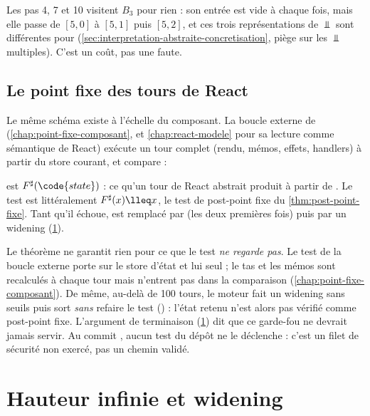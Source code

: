 Les pas 4, 7 et 10 visitent $B_3$ pour rien : son entrée est vide à chaque
fois, mais elle passe de $[5,0]$ à $[5,1]$ puis $[5,2]$, et ces trois
représentations de $\Bot$ sont différentes pour 
(\cref{sec:interpretation-abstraite-concretisation}, piège sur les $\Bot$
multiples). C'est un coût, pas une faute.

\subsection{Le point fixe des tours de React}

Le même schéma existe à l'échelle du composant. La boucle externe de
 (\cref{chap:point-fixe-composant}, et
\cref{chap:react-modele} pour sa lecture comme sémantique de React) exécute un
tour complet (rendu, mémos, effets, handlers) à partir du store courant, et
compare :


 est $F^\sharp(\code{state})$ : ce qu'un tour de React
abstrait produit à partir de . Le test
 est littéralement \og $F^\sharp(x) \lleq x$\fg{},
le test de post-point fixe du \cref{thm:post-point-fixe}. Tant qu'il échoue,
 est remplacé par  (les deux premières fois) puis
par un widening (\cref{sec:interpretation-abstraite-widening}).

\begin{piege}
  Le théorème ne garantit rien pour ce que le test \emph{ne regarde pas}. Le
  test de la boucle externe porte sur le store d'état et lui seul ; le tas et
  les mémos sont recalculés à chaque tour mais n'entrent pas dans la
  comparaison (\cref{chap:point-fixe-composant}). De même, au-delà de
  100 tours, le moteur fait un widening sans seuils puis sort \emph{sans}
  refaire le test () : l'état retenu
  n'est alors pas vérifié comme post-point fixe. L'argument de terminaison
  (\cref{sec:interpretation-abstraite-widening}) dit que ce garde-fou ne
  devrait jamais servir. Au commit \snapshotCommit{}, aucun test du dépôt ne
  le déclenche : c'est un filet de sécurité non exercé, pas un chemin validé.
\end{piege}

\section{Hauteur infinie et widening}
\label{sec:interpretation-abstraite-widening}

